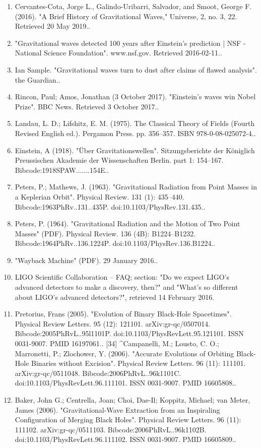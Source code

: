 \begin{enumerate}
\item Cervantes-Cota, Jorge L., Galindo-Uribarri, Salvador, and Smoot, George F. (2016). "A Brief History of Gravitational Waves," Universe, 2, no. 3, 22. Retrieved 20 May 2019..
\item "Gravitational waves detected 100 years after Einstein's prediction | NSF - National Science Foundation". www.nsf.gov. Retrieved 2016-02-11..
\item Ian Sample. "Gravitational waves turn to dust after claims of flawed analysis". the Guardian..
\item Rincon, Paul; Amos, Jonathan (3 October 2017). "Einstein's waves win Nobel Prize". BBC News. Retrieved 3 October 2017..
\item Landau, L. D.; Lifshitz, E. M. (1975). The Classical Theory of Fields (Fourth Revised English ed.). Pergamon Press. pp. 356–357. ISBN 978-0-08-025072-4..
\item Einstein, A (1918). "Über Gravitationswellen". Sitzungsberichte der Königlich Preussischen Akademie der Wissenschaften Berlin. part 1: 154–167. Bibcode:1918SPAW.......154E..
\item Peters, P.; Mathews, J. (1963). "Gravitational Radiation from Point Masses in a Keplerian Orbit". Physical Review. 131 (1): 435–440. Bibcode:1963PhRv..131..435P. doi:10.1103/PhysRev.131.435..
\item Peters, P. (1964). "Gravitational Radiation and the Motion of Two Point Masses" (PDF). Physical Review. 136 (4B): B1224–B1232. Bibcode:1964PhRv..136.1224P. doi:10.1103/PhysRev.136.B1224..
\item "Wayback Machine" (PDF). 29 January 2016..
\item LIGO Scientific Collaboration – FAQ; section: "Do we expect LIGO's advanced detectors to make a discovery, then?" and "What's so different about LIGO's advanced detectors?", retrieved 14 February 2016.
\item Pretorius, Frans (2005). "Evolution of Binary Black-Hole Spacetimes". Physical Review Letters. 95 (12): 121101. arXiv:gr-qc/0507014. Bibcode:2005PhRvL..95l1101P. doi:10.1103/PhysRevLett.95.121101. ISSN 0031-9007. PMID 16197061..
[34]
^Campanelli, M.; Lousto, C. O.; Marronetti, P.; Zlochower, Y. (2006). "Accurate Evolutions of Orbiting Black-Hole Binaries without Excision". Physical Review Letters. 96 (11): 111101. arXiv:gr-qc/0511048. Bibcode:2006PhRvL..96k1101C. doi:10.1103/PhysRevLett.96.111101. ISSN 0031-9007. PMID 16605808..
\item Baker, John G.; Centrella, Joan; Choi, Dae-Il; Koppitz, Michael; van Meter, James (2006). "Gravitational-Wave Extraction from an Inspiraling Configuration of Merging Black Holes". Physical Review Letters. 96 (11): 111102. arXiv:gr-qc/0511103. Bibcode:2006PhRvL..96k1102B. doi:10.1103/PhysRevLett.96.111102. ISSN 0031-9007. PMID 16605809..

\end{enumerate}
